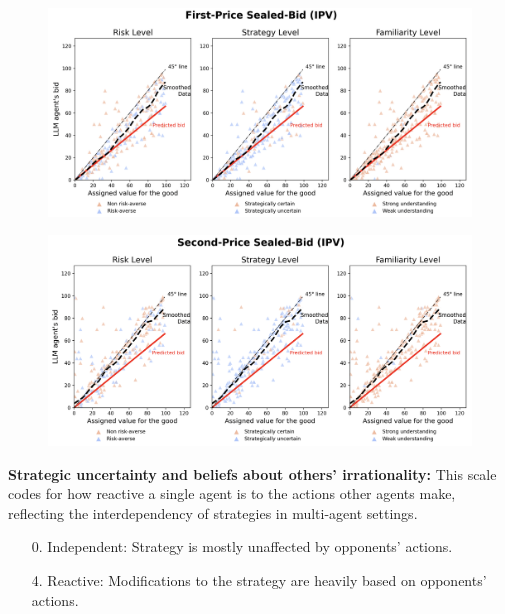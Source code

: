 \documentclass{article} %
\begin{document}
\begin{figure}[h]
    \centering \includegraphics[width=\linewidth]{Figs/First_semantic.png}
    \caption{ }
    \label{fig:FP-Semantic}
\end{figure}

\begin{figure}[h]
    \centering \includegraphics[width=\linewidth]{Figs/Second_semantic.png}
    \caption{ }
    \label{fig:SP-Semantic}
\end{figure}

\textbf{Strategic uncertainty and beliefs about others' irrationality:} This scale codes for how reactive a single agent is to the actions other agents make, reflecting the interdependency of strategies in multi-agent settings.

\begin{enumerate}
    \item[0.] Independent: Strategy is mostly unaffected by opponents' actions. 
    \item[4.] Reactive: Modifications to the strategy are heavily based on opponents' actions. 
\end{enumerate}
\end{document}

